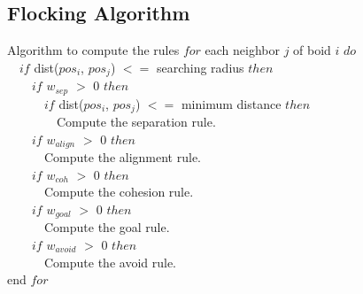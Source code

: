 \documentclass[red]{beamer}
\begin{document}
\subsection{Flocking Algorithm}

\begin{frame}{Algorithm to compute the rules}
	\alert<1>{$for$ each neighbor $j$ of boid $i$ $do$}			\\
	\alert<2>{~~$if$ dist($pos_i$, $pos_j$) $<=$ searching radius $then$}	\\
	\alert<4>{~~~~$if$ $w_{sep}$ $>$ 0 $then$}					\\
	\alert<4>{~~~~~~$if$ dist($pos_i$, $pos_j$) $<=$ minimum distance $then$}	\\
	\alert<4>{~~~~~~~~Compute the separation rule.} \\
	\alert<5>{~~~~$if$ $w_{align}$ $>$ 0 $then$}				\\
	\alert<5>{~~~~~~Compute the alignment rule.} \\
	\alert<6>{~~~~$if$ $w_{coh}$ $>$ 0 $then$}					\\
	\alert<6>{~~~~~~Compute the cohesion rule.} \\
	\alert<7>{~~~~$if$ $w_{goal}$ $>$ 0 $then$}					\\
	\alert<7>{~~~~~~Compute the goal rule.} \\
	\alert<8>{~~~~$if$ $w_{avoid}$ $>$ 0 $then$}					\\
	\alert<8>{~~~~~~Compute the avoid rule.} \\
	\alert<9>{end $for$}
\end{frame}
\end{document}

